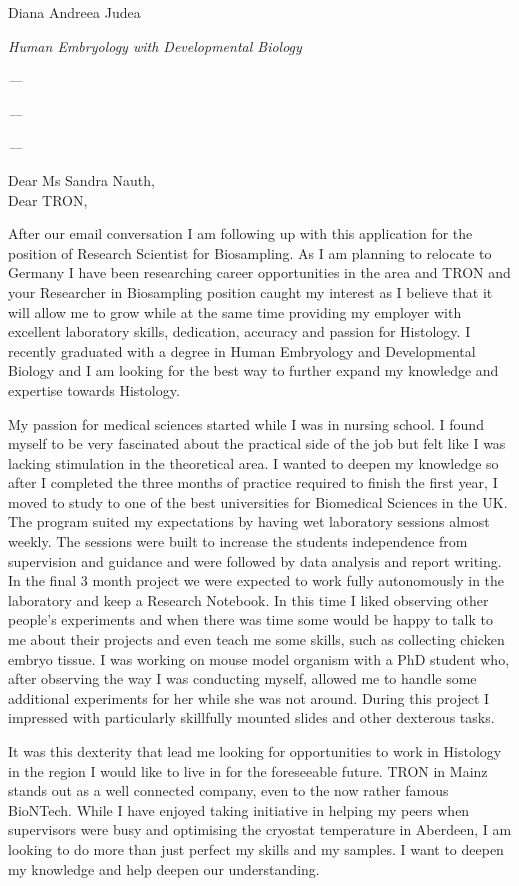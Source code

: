 \documentclass[paper=a4,fontsize=11pt]{scrartcl} %
\newcommand{\sepspace}{\vspace*{1em}}		%
\newcommand{\MyName}[1]{ %
  \Huge \usefont{OT1}{phv}{b}{n} \hfill \textcolor{titleColor}{#1}
  \par \normalsize \normalfont}
\newcommand{\MyCoverSlogan}[4]{ %
  \large \usefont{OT1}{phv}{m}{n}\hfill \textcolor{headerColor}{\textit{#1} }
  \sepspace
  \par \normalsize \usefont{OT1}{phv}{m}{n}\hfill \textcolor{headerColor}{\textit{#2}}
  \par \normalsize \usefont{OT1}{phv}{m}{n}\hfill \textcolor{headerColor}{\textit{#3}}
  \par \normalsize \usefont{OT1}{phv}{m}{n}\hfill \textcolor{headerColor}{\textit{#4}}
  \par \normalsize \normalfont}
\begin{document}
  
  \MyName{Diana Andreea Judea}
  \MyCoverSlogan{Human Embryology with Developmental Biology}{---}{---}{---}
  \sepspace %
  
  \noindent
  Dear Ms Sandra Nauth, \\
  Dear TRON,

  \sepspace 

  \noindent After our email conversation I am following up with this
  application for the position of Research Scientist for Biosampling.  As I am planning
  to relocate to Germany I have been researching career opportunities in the area and
  TRON and your Researcher in Biosampling position caught my interest as I
  believe that it will allow me to grow while at the same time providing my
  employer with excellent laboratory skills, dedication, accuracy and passion
  for Histology.  I recently graduated with a degree in Human Embryology and
  Developmental Biology and I am looking for the best way to further expand my
  knowledge and expertise towards Histology.

  \sepspace 

  \noindent My passion for medical sciences started while I was in nursing
  school.  I found myself to be very fascinated about the practical side of the
  job but felt like I was lacking stimulation in the theoretical area.  I
  wanted to deepen my knowledge so after I completed the three months of practice
  required to finish the first year, I moved to study to one of the best
  universities for Biomedical Sciences in the UK.  The program suited my
  expectations by having wet laboratory sessions almost weekly.  The sessions
  were built to increase the students independence from supervision and
  guidance and were followed by data analysis and report writing.  In the final
  3 month project we were expected to work fully autonomously in the laboratory
  and keep a Research Notebook.  In this time I liked observing other
  people’s experiments and when there was time some would be happy to talk to
  me about their projects and even teach me some skills, such as
  collecting chicken embryo tissue.  I was working on mouse model organism
  with a PhD student who, after observing the way I was conducting myself,
  allowed me to handle some additional experiments for her while she was not
  around.  During this project I impressed with particularly skillfully
  mounted slides and other dexterous tasks.

  \sepspace 
  \noindent It was this dexterity that lead me looking for opportunities to
  work in Histology in the region I would like to live in for the foreseeable
  future.  TRON in Mainz stands out as a well connected company, even to the
  now rather famous BioNTech.  While I have enjoyed taking initiative in
  helping my peers when supervisors were busy and optimising the cryostat
  temperature in Aberdeen, I am looking to do more than just perfect my skills
  and my samples. I want to deepen my knowledge and help deepen our
  understanding.  
\end{document}
